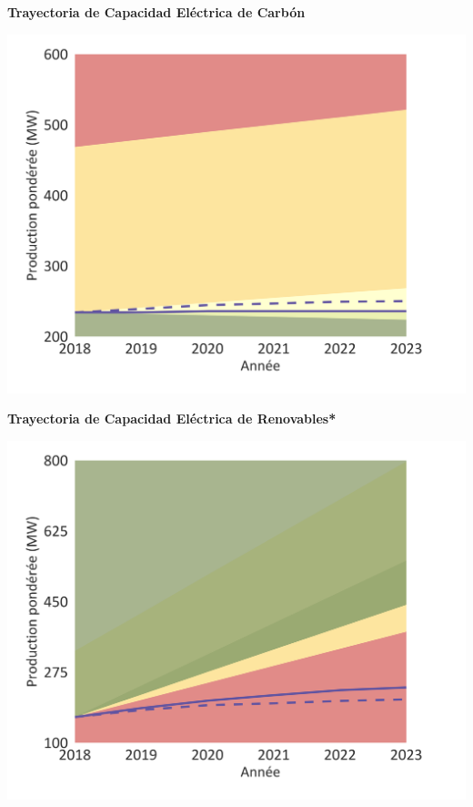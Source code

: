 \documentclass[10pt,table]{article}\usepackage[]{graphicx}\usepackage[]{color}
\begin{document}
	\begin{minipage}[t]{.49\linewidth}
		\textbf{Trayectoria de Capacidad Eléctrica de Carbón }
		
		\includegraphics[trim = {0 0cm 0 0},width=1\linewidth]{ReportOutputs/Fig07}
		
		\textbf{Trayectoria de Capacidad Eléctrica de Renovables* }
		
		\includegraphics[trim = {0 0cm 0 0},width=.99\linewidth]{ReportOutputs/Fig08}
	\end{minipage}	
	\hspace{.02\linewidth}
\end{document}
